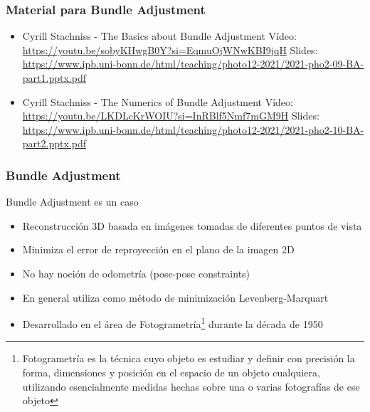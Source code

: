 \begin{frame}
    \frametitle{Material para Bundle Adjustment}
    \begin{itemize}
        \item Cyrill Stachniss - The Basics about Bundle Adjustment Vídeo: \url{https://youtu.be/sobyKHwgB0Y?si=EqmuOjWNwKBI9jqH} Slides: \url{https://www.ipb.uni-bonn.de/html/teaching/photo12-2021/2021-pho2-09-BA-part1.pptx.pdf}
        \item Cyrill Stachniss - The Numerics of Bundle Adjustment Vídeo: \url{https://youtu.be/LKDLcKrWOIU?si=InRBlf5Nmf7mGM9H} Slides: \url{https://www.ipb.uni-bonn.de/html/teaching/photo12-2021/2021-pho2-10-BA-part2.pptx.pdf}
    \end{itemize}
\end{frame}

\begin{frame}
    \frametitle{Bundle Adjustment}
    
    Bundle Adjustment es un caso
    
    \begin{itemize}
        \item Reconstrucción 3D basada en imágenes tomadas de diferentes puntos de vista
        \item Minimiza el error de reproyección en el plano de la imagen 2D
        \item No hay noción de odometría (pose-pose constraints)
        \item En general utiliza como método de minimización Levenberg-Marquart
        \item Desarrollado en el área de Fotogrametría\footnote{Fotogrametría es la técnica cuyo objeto es estudiar y definir con precisión la forma, dimensiones y posición en el espacio de un objeto cualquiera, utilizando esencialmente medidas hechas sobre una o varias fotografías de ese objeto} durante la década de 1950
    \end{itemize}
    
\end{frame}

